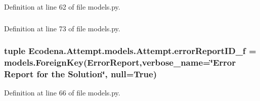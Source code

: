 Definition at line 62 of file models.py.

\hypertarget{class_ecodena_1_1_attempt_1_1models_1_1_attempt_a5868c5092dc59689fe48af770ea41bc5}{
\subsubsection[{attemptID\_\-f}]{}}
\label{d5/da0/class_ecodena_1_1_attempt_1_1models_1_1_attempt_a5868c5092dc59689fe48af770ea41bc5}


Definition at line 73 of file models.py.

\hypertarget{class_ecodena_1_1_attempt_1_1models_1_1_attempt_ae2cd37972f3706554532bf2e958c5b7d}{
\subsubsection[{errorReportID\_\-f}]{\setlength{\rightskip}{0pt plus 5cm}tuple {\bf Ecodena.Attempt.models.Attempt.errorReportID\_\-f} = models.ForeignKey({\bf ErrorReport},verbose\_\-name=\char`\"{}Error Report for the Solution\char`\"{}, null=True)}}
\label{d5/da0/class_ecodena_1_1_attempt_1_1models_1_1_attempt_ae2cd37972f3706554532bf2e958c5b7d}


Definition at line 66 of file models.py.

\hypertarget{class_ecodena_1_1_attempt_1_1models_1_1_attempt_ac1e3f9e2d93bbdd1d339f9331a560926}{
\subsubsection[{errorReportID\_\-f}]{}}
\label{d5/da0/class_ecodena_1_1_attempt_1_1models_1_1_attempt_ac1e3f9e2d93bbdd1d339f9331a560926}


